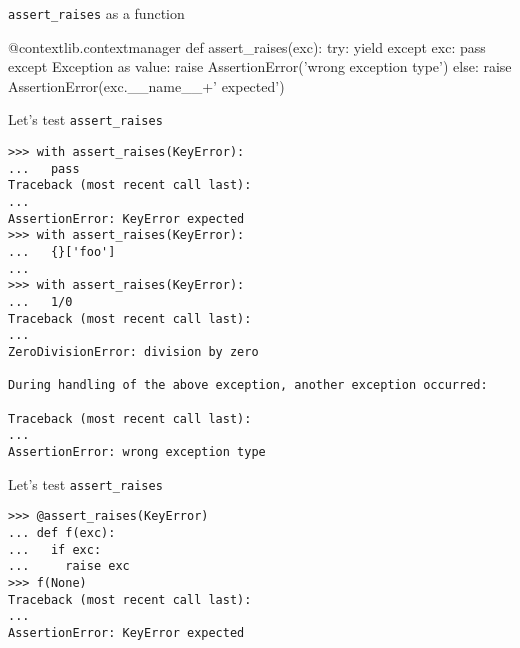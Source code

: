\documentclass{beamer}
\begin{document}
\begin{frame}[fragile]{\texttt{assert\_raises} as a function}
  \begin{pycode}
    @contextlib.contextmanager
    def assert_raises(exc):
        try:
            yield
        except exc:
            pass
        except Exception as value:
            raise AssertionError('wrong exception type')
        else:
            raise AssertionError(exc.__name__+' expected')
  \end{pycode}
\end{frame}

\begin{frame}[fragile]{Let's test \texttt{assert\_raises}}
  \begin{verbatim}
>>> with assert_raises(KeyError):
...   pass
Traceback (most recent call last):
...
AssertionError: KeyError expected
>>> with assert_raises(KeyError):
...   {}['foo']
...
>>> with assert_raises(KeyError):
...   1/0
Traceback (most recent call last):
...
ZeroDivisionError: division by zero

During handling of the above exception, another exception occurred:

Traceback (most recent call last):
...
AssertionError: wrong exception type
  \end{verbatim}
\end{frame}

\begin{frame}[fragile]{Let's test \texttt{assert\_raises}}
  \begin{verbatim}
>>> @assert_raises(KeyError)
... def f(exc):
...   if exc:
...     raise exc
>>> f(None)
Traceback (most recent call last):
...
AssertionError: KeyError expected
  \end{verbatim}
\end{frame}




\end{document}
